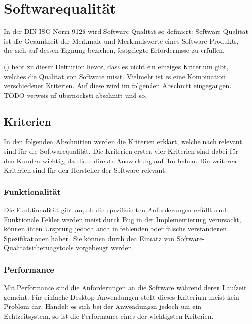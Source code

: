 
\section{Softwarequalität}\label{softwarequality}
In der DIN-ISO-Norm 9126 wird Software Qualität so definiert:
\dq Software-Qualität ist die Gesamtheit der Merkmale und Merkmalswerte eines Software-Produkts, die sich auf dessen Eignung beziehen, festgelegte Erfordernisse zu erfüllen.\dq

\citeauthor{hoffmann2013software} (\citeyear{hoffmann2013software}) hebt zu dieser Definition hevor, dass es nicht ein einziges Kriterium gibt, welches die Qualität von Software misst.
Vielmehr ist es eine Kombination verschiedener Kriterien.
Auf diese wird im folgenden Abschnitt eingegangen.
TODO verweis uf übernöchsti abschnitt und so.

\subsection{Kriterien}
In den folgenden Abschnitten werden die Kriterien erklärt, welche nach \citeauthor{hoffmann2013software} relevant sind für die Softwarequalität.
Die Kriterien ersten vier Kriterien sind dabei für den Kunden wichtig, da diese direkte Auswirkung auf ihn haben.
Die weiteren Kriterien sind für den Hersteller der Software relevant.
\subsubsection{Funktionalität}
Die Funktionalität gibt an, ob die spezifizierten Anforderungen erfüllt sind.
Funktionale Fehler werden meist durch Bug in der Implementierung verursacht, können ihren Ursprung jedoch auch in fehlenden oder falsche verstandenen Spezifikationen haben.
Sie können durch den Einsatz von Software-Qualitätsicherungstools vorgebeugt werden.

\subsubsection{Performance}
Mit Performance sind die Anforderungen an die Software während deren Laufzeit gemeint.
Für einfache Desktop Anwendungen stellt dieses Kriterium meist kein Problem dar.
Handelt es sich bei der Anwendungen jedoch um ein Echtzeitsystem, so ist die Performance eines der wichtigsten Kriterien.

